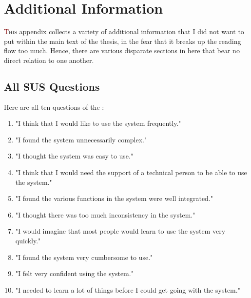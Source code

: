 \chapter{Additional Information}

\lettrine[lines=3]{\textcolor{Maroon}{T}}{his} appendix collects a variety of additional information that I did not want to put within the main text of the thesis, in the fear that it breaks up the reading flow too much.
Hence, there are various disparate sections in here that bear no direct relation to one another.

\section{All SUS Questions}\label{app:susq}
Here are all ten questions of the :

\begin{enumerate}
	\item "I think that I would like to use the system frequently."
	\item "I found the system unnecessarily complex."
	\item "I thought the system was easy to use."
	\item "I think that I would need the support of a technical person to be able to use the system."
	\item "I found the various functions in the system were well integrated."
	\item "I thought there was too much inconsistency in the system."
	\item "I would imagine that most people would learn to use the system very quickly."
	\item "I found the system very cumbersome to use."
	\item "I felt very confident using the system."
	\item "I needed to learn a lot of things before I could get going with the system."
\end{enumerate}

